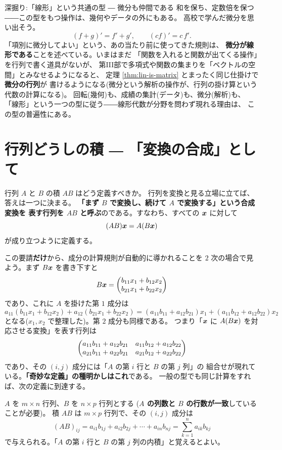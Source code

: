 \begin{itembox}[l]{深掘り:「線形」という共通の型 ― 微分も仲間である}
和を保ち、定数倍を保つ――この型をもつ操作は、幾何やデータの外にもある。
高校で学んだ微分を思い出そう。
\[
(f + g)' = f' + g', \qquad (cf)' = c\,f'.
\]
「項別に微分してよい」という、あの当たり前に使ってきた規則は、
\textbf{微分が線形である}ことを述べている。いまはまだ
「関数を入れると関数が出てくる操作」を行列で書く道具がないが、
第III部で多項式や関数の集まりを「ベクトルの空間」とみなせるようになると、
定理 \ref{thm:lin-is-matrix} とまったく同じ仕掛けで\textbf{微分の行列}が
書けるようになる(微分という解析の操作が、行列の掛け算という代数の計算になる)。
回転(幾何)も、成績の集計(データ)も、微分(解析)も、
「線形」という一つの型に従う――線形代数が分野を問わず現れる理由は、
この型の普遍性にある。
\end{itembox}

\section{行列どうしの積 ― 「変換の合成」として}

行列 $A$ と $B$ の積 $AB$ はどう定義すべきか。
行列を変換と見る立場に立てば、答えは一つに決まる。
\textbf{「まず $B$ で変換し、続けて $A$ で変換する」という合成変換を
表す行列を $AB$ と呼ぶ}のである。すなわち、すべての $\bm{x}$ に対して
\[
(AB)\bm{x} = A(B\bm{x})
\]
が成り立つように定義する。

この要請\textbf{だけ}から、成分の計算規則が自動的に導かれることを
$2$ 次の場合で見よう。まず $B\bm{x}$ を書き下すと
\[
B\bm{x} = \begin{pmatrix}b_{11}x_1 + b_{12}x_2 \\ b_{21}x_1 + b_{22}x_2\end{pmatrix}
\]
であり、これに $A$ を掛けた第 $1$ 成分は
\[
a_{11}(b_{11}x_1 + b_{12}x_2) + a_{12}(b_{21}x_1 + b_{22}x_2)
= (a_{11}b_{11} + a_{12}b_{21})x_1 + (a_{11}b_{12} + a_{12}b_{22})x_2
\]
となる($x_1, x_2$ で整理した)。第 $2$ 成分も同様である。
つまり「$\bm{x}$ に $A(B\bm{x})$ を対応させる変換」を表す行列は
\[
\begin{pmatrix}a_{11}b_{11} + a_{12}b_{21} & a_{11}b_{12} + a_{12}b_{22} \\
a_{21}b_{11} + a_{22}b_{21} & a_{21}b_{12} + a_{22}b_{22}\end{pmatrix}
\]
であり、その $(i,j)$ 成分には「$A$ の第 $i$ 行と $B$ の第 $j$ 列」の
組合せが現れている。\textbf{「奇妙な定義」の種明かしはこれ}である。
一般の型でも同じ計算をすれば、次の定義に到達する。

\begin{teigi}[行列の積]
$A$ を $m \times n$ 行列、$B$ を $n \times p$ 行列とする
(\textbf{$A$ の列数と $B$ の行数が一致}していることが必要)。
積 $AB$ は $m \times p$ 行列で、その $(i,j)$ 成分は
\[
(AB)_{ij} = a_{i1} b_{1j} + a_{i2} b_{2j} + \cdots + a_{in} b_{nj}
= \sum_{k=1}^{n} a_{ik} b_{kj}
\]
で与えられる。「$A$ の第 $i$ 行と $B$ の第 $j$ 列の内積」と覚えるとよい。
\end{teigi}

